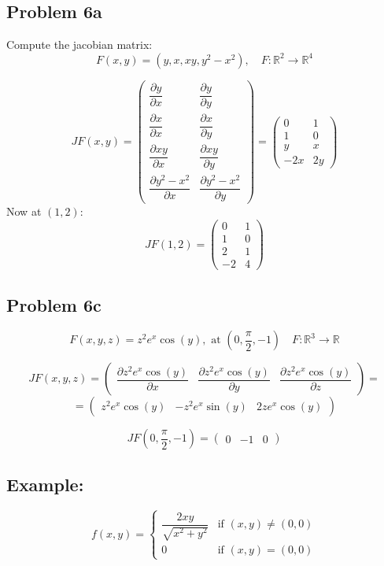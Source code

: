 \documentclass[11pt]{article}
\begin{document}
\subsection*{Problem 6a}
Compute the jacobian matrix:
\[
F(x,y) = (y,x,xy,y^2 - x^2), \quad F : \mathbb{R}^2 \rightarrow \mathbb{R}^4
\]

\[
JF(x,y) =
\begin{pmatrix}
    \dfrac{\partial y}{\partial x} & \dfrac{\partial y}{\partial y} \\
    \dfrac{\partial x}{\partial x} & \dfrac{\partial x}{\partial y} \\
    \dfrac{\partial xy}{\partial x} & \dfrac{\partial xy}{\partial y} \\
    \dfrac{\partial y^2 - x^2}{\partial x} & \dfrac{\partial y^2 - x^2}{\partial y}
\end{pmatrix} =
\begin{pmatrix}
    0 & 1 \\
    1 & 0 \\
    y & x \\
    -2x & 2y
\end{pmatrix}
\]
Now at $(1,2)$:
\[
JF(1,2) =
\begin{pmatrix}
    0 & 1 \\
    1 & 0 \\
    2 & 1 \\
    -2 & 4
\end{pmatrix}
\]

\subsection*{Problem 6c}
\[
F(x,y,z) = z^2 e^x \cos(y), \text{ at } (0, \frac{\pi}{2}, -1) \quad F : \mathbb{R}^3 \rightarrow \mathbb{R}
\]

\[
JF(x,y,z) =
\begin{pmatrix}
    \dfrac{\partial z^2 e^x \cos(y)}{\partial x} & \dfrac{\partial z^2 e^x \cos(y)}{\partial y} & \dfrac{\partial z^2 e^x \cos(y)}{\partial z}
\end{pmatrix} =
\]
\[
= 
\begin{pmatrix}
    z^2 e^x \cos(y) & -z^2 e^x \sin(y) & 2z e^x \cos(y)
\end{pmatrix}
\]

\[
JF(0, \frac{\pi}{2}, -1) =
\begin{pmatrix}
    0 & -1 & 0
\end{pmatrix}
\]

\subsection*{Example:}
\[
f(x,y) = 
\begin{cases}
    \dfrac{2xy}{\sqrt{x^2 + y^2}} & \text{if } (x,y) \neq (0,0) \\
    0 & \text{if } (x,y) = (0,0)
\end{cases}
\]
\end{document}
